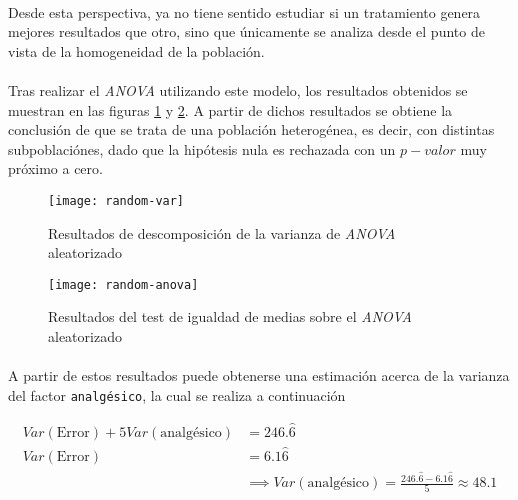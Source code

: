 \documentclass[11pt]{article}
\begin{document}
      \paragraph{}
      Desde esta perspectiva, ya no tiene sentido estudiar si un tratamiento genera mejores resultados que otro, sino que únicamente se analiza desde el punto de vista de la homogeneidad de la población.

      \paragraph{}
      Tras realizar el \emph{ANOVA} utilizando este modelo, los resultados obtenidos se muestran en las figuras \ref{fig:random-anova-results-1} y \ref{fig:random-anova-results-2}. A partir de dichos resultados se obtiene la conclusión de que se trata de una población heterogénea, es decir, con distintas subpoblaciónes, dado que la hipótesis nula es rechazada con un $p-valor$ muy próximo a cero.

      \begin{figure}[!h]
        \centering
        \texttt{[image: random-var]}
        \caption{Resultados de descomposición de la varianza de \emph{ANOVA} aleatorizado}
        \label{fig:random-anova-results-1}
      \end{figure}

      \begin{figure}[!h]
        \centering
        \texttt{[image: random-anova]}
        \caption{Resultados del test de igualdad de medias sobre el \emph{ANOVA} aleatorizado}
        \label{fig:random-anova-results-2}
      \end{figure}

      \paragraph{}
      A partir de estos resultados puede obtenerse una estimación acerca de la varianza del factor \texttt{analgésico}, la cual se realiza a continuación

      \begin{align*}
        Var(\text{Error}) + 5 Var(\text{analgésico}) &= 246.\widehat{6} \\
        Var(\text{Error}) &= 6.1\widehat{6} \\
        &\implies Var(\text{analgésico}) = \frac{246.\widehat{6} - 6.1\widehat{6}}{5} \approx 48.1
      \end{align*}
\end{document}
